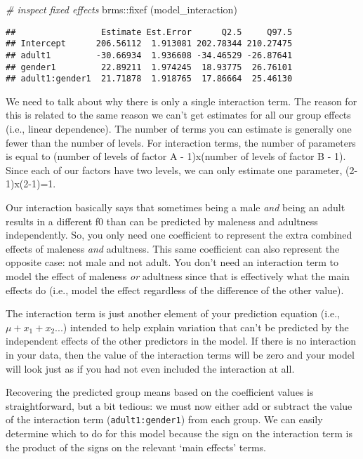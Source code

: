 \documentclass[
]{book}
\newenvironment{Shaded}{\begin{snugshade}}{\end{snugshade}}
\newcommand{\CommentTok}[1]{\textcolor[rgb]{0.56,0.35,0.01}{\textit{#1}}}
\newcommand{\FunctionTok}[1]{\textcolor[rgb]{0.00,0.00,0.00}{#1}}
\newcommand{\NormalTok}[1]{#1}
\newcommand{\SpecialCharTok}[1]{\textcolor[rgb]{0.00,0.00,0.00}{#1}}
\begin{document}
\begin{Shaded}
\begin{Highlighting}[]
\CommentTok{\# inspect fixed effects}
\NormalTok{brms}\SpecialCharTok{::}\FunctionTok{fixef}\NormalTok{ (model\_interaction)}
\end{Highlighting}
\end{Shaded}

\begin{verbatim}
##                 Estimate Est.Error      Q2.5     Q97.5
## Intercept      206.56112  1.913081 202.78344 210.27475
## adult1         -30.66934  1.936608 -34.46529 -26.87641
## gender1         22.89211  1.974245  18.93775  26.76101
## adult1:gender1  21.71878  1.918765  17.86664  25.46130
\end{verbatim}

We need to talk about why there is only a single interaction term. The reason for this is related to the same reason we can't get estimates for all our group effects (i.e., linear dependence). The number of terms you can estimate is generally one fewer than the number of levels. For interaction terms, the number of parameters is equal to (number of levels of factor A - 1)x(number of levels of factor B - 1). Since each of our factors have two levels, we can only estimate one parameter, (2-1)x(2-1)=1.

Our interaction basically says that sometimes being a male \emph{and} being an adult results in a different f0 than can be predicted by maleness and adultness independently. So, you only need one coefficient to represent the extra combined effects of maleness \emph{and} adultness. This same coefficient can also represent the opposite case: not male and not adult. You don't need an interaction term to model the effect of maleness \emph{or} adultness since that is effectively what the main effects do (i.e., model the effect regardless of the difference of the other value).

The interaction term is just another element of your prediction equation (i.e., \(\mu + x_1+x_2...\)) intended to help explain variation that can't be predicted by the independent effects of the other predictors in the model. If there is no interaction in your data, then the value of the interaction terms will be zero and your model will look just as if you had not even included the interaction at all.

Recovering the predicted group means based on the coefficient values is straightforward, but a bit tedious: we must now either add or subtract the value of the interaction term (\texttt{adult1:gender1}) from each group. We can easily determine which to do for this model because the sign on the interaction term is the product of the signs on the relevant `main effects' terms.
\end{document}
